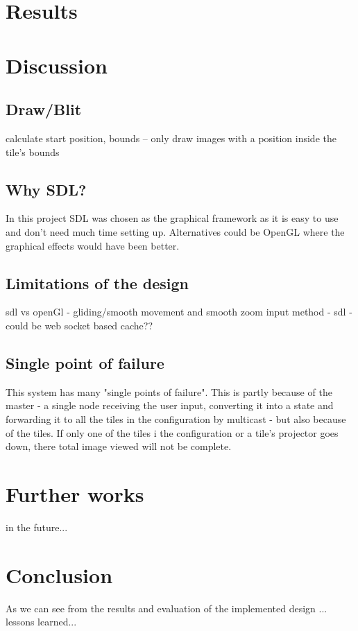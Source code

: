 \documentclass[12pt, a4paper, oneside]{article}
\begin{document}
\section{Results}
\section{Discussion}
\subsection{Draw/Blit}
calculate start position, bounds – only draw images with a position inside the tile's bounds
\subsection{Why SDL?}
In this project SDL was chosen as the graphical framework as it is easy to use and don't need much time setting up. Alternatives could be OpenGL where the graphical effects would have been better. 

\subsection{Limitations of the design}
sdl vs openGl - gliding/smooth movement and smooth zoom
input method - sdl - could be web socket based
cache??

\subsection{Single point of failure}
This system has many "single points of failure". This is partly because of the master - a single node receiving the user input, converting it into a state and forwarding it to all the tiles in the configuration by multicast - but also because of the tiles. If only one of the tiles i the configuration or a tile's projector goes down, there total image viewed will not be complete.  

\section{Further works}
in the future...

\section{Conclusion}
As we can see from the results and evaluation of the implemented design ...
lessons learned...

\newpage




\end{document}
